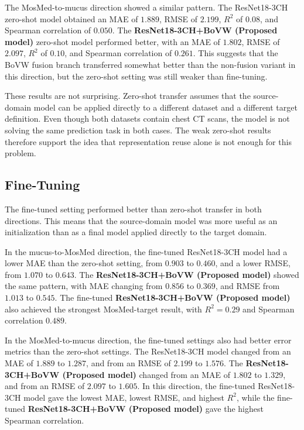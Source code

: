 The MosMed-to-mucus direction showed a similar pattern. The ResNet18-3CH zero-shot model obtained an MAE of \(1.889\), RMSE of \(2.199\), \(R^2\) of \(0.08\), and Spearman correlation of \(0.050\). The \textbf{ResNet18-3CH+BoVW (Proposed model)} zero-shot model performed better, with an MAE of \(\mathbf{1.802}\), RMSE of \(\mathbf{2.097}\), \(R^2\) of \(\mathbf{0.10}\), and Spearman correlation of \(\mathbf{0.261}\). This suggests that the BoVW fusion branch transferred somewhat better than the non-fusion variant in this direction, but the zero-shot setting was still weaker than fine-tuning.

These results are not surprising. Zero-shot transfer assumes that the source-domain model can be applied directly to a different dataset and a different target definition. Even though both datasets contain chest CT scans, the model is not solving the same prediction task in both cases. The weak zero-shot results therefore support the idea that representation reuse alone is not enough for this problem.


\subsection{Fine-Tuning}
The fine-tuned setting performed better than zero-shot transfer in both directions. This means that the source-domain model was more useful as an initialization than as a final model applied directly to the target domain.

In the mucus-to-MosMed direction, the fine-tuned ResNet18-3CH model had a lower MAE than the zero-shot setting, from \(0.903\) to \(0.460\), and a lower RMSE, from \(1.070\) to \(0.643\). The \textbf{ResNet18-3CH+BoVW (Proposed model)} showed the same pattern, with MAE changing from \(0.856\) to \(\mathbf{0.369}\), and RMSE from \(1.013\) to \(\mathbf{0.545}\). The fine-tuned \textbf{ResNet18-3CH+BoVW (Proposed model)} also achieved the strongest MosMed-target result, with \(R^2=\mathbf{0.29}\) and Spearman correlation \(\mathbf{0.489}\).


In the MosMed-to-mucus direction, the fine-tuned settings also had better error metrics than the zero-shot settings. The ResNet18-3CH model changed from an MAE of \(1.889\) to \(1.287\), and from an RMSE of \(2.199\) to \(1.576\). The \textbf{ResNet18-3CH+BoVW (Proposed model)} changed from an MAE of \(1.802\) to \(\mathbf{1.329}\), and from an RMSE of \(2.097\) to \(\mathbf{1.605}\). In this direction, the fine-tuned ResNet18-3CH model gave the lowest MAE, lowest RMSE, and highest \(R^2\), while the fine-tuned \textbf{ResNet18-3CH+BoVW (Proposed model)} gave the highest Spearman correlation.


